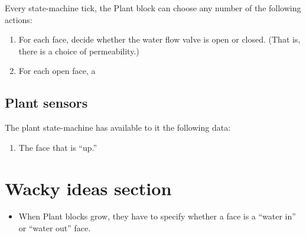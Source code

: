 \documentclass[10pt, a4paper, twocolumn]{article}
\begin{document}
Every state-machine tick, the Plant block can choose any number of the
following actions:

\begin{enumerate}
\item For each face, decide whether the water flow valve is open or
  closed. (That is, there is a choice of permeability.)
\item For each open face, a 
\end{enumerate}

\subsection{Plant sensors}

The plant state-machine has available to it the following data:
\begin{enumerate}
\item The face that is ``up.'' 
\end{enumerate}


\section{Wacky ideas section}

\begin{itemize}
\item When Plant blocks grow, they have to specify whether a face is a
  ``water in'' or ``water out'' face. 
\end{itemize}
\end{document}
